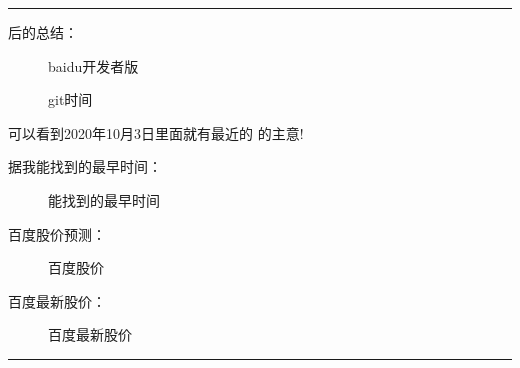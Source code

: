\documentclass[letterpaper,11pt,english]{sphinxmanual}
\begin{document}


\bigskip\hrule\bigskip


后的总结：

\begin{figure}[H]
\centering
\capstart

\noindent{}
\caption{baidu开发者版}\label{\detokenize{get_started:id13}}\end{figure}

\begin{figure}[H]
\centering
\capstart

\noindent{}
\caption{git时间}\label{\detokenize{get_started:id14}}\end{figure}

可以看到2020年10月3日里面就有最近的
 的主意!

据我能找到的最早时间：

\begin{figure}[H]
\centering
\capstart

\noindent{}
\caption{能找到的最早时间}\label{\detokenize{get_started:id15}}\end{figure}

百度股价预测：

\begin{figure}[H]
\centering
\capstart

\noindent{}
\caption{百度股价}\label{\detokenize{get_started:id16}}\end{figure}

百度最新股价：

\begin{figure}[H]
\centering
\capstart

\noindent{}
\caption{百度最新股价}\label{\detokenize{get_started:id17}}\end{figure}


\bigskip\hrule\bigskip



\subsubsection{}
\label{\detokenize{get_started:id1}}
\end{document}
